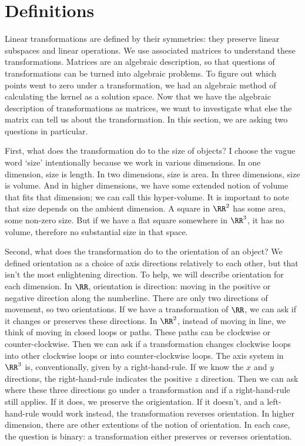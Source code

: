 \documentclass[fleqn]{report}
\begin{document}
\section{Definitions}
\label{determinants-definition}

Linear transformations are defined by their symmetries: they
preserve linear subspaces and linear operations. We use
associated matrices to understand these transformations.
Matrices are an algebraic description, so that questions of
transformations can be turned into algebraic problems. To
figure out which points went to zero under a transformation,
we had an algebraic method of calculating the kernel as a
solution space. Now that we have the algebraic description of
transformations as matrices, we want to investigate what else
the matrix can tell us about the transformation. In this
section, we are asking two questions in particular. 

First, what does the transformation do to the size of objects?
I choose the vague word `size' intentionally because we work
in various dimensions. In one dimension, size is length. In
two dimensions, size is area. In three dimensions, size is
volume. And in higher dimensions, we have some extended
notion of volume that fits that dimension; we can call this
hyper-volume. It is important to note that size depends on
the ambient dimension. A square in $\RR^2$ has some area,
some non-zero size. But if we have a flat square somewhere in
$\RR^3$, it has no volume, therefore no substantial size in
that space. 

Second, what does the transformation do to the orientation of
an object? We defined orientation as a choice of axis
directions relatively to each other, but that isn't the most
enlightening direction. To help, we will describe orientation
for each dimension. In $\RR$, orientation is direction: moving
in the positive or negative direction along the numberline.
There are only two directions of movement, so two
orientations. If we have a transformation of $\RR$, we can ask
if it changes or preserves these directions. In $\RR^2$,
instead of moving in line, we think of moving in closed loops
or paths. These paths can be clockwise or counter-clockwise.
Then we can ask if a transformation changes clockwise loops
into other clockwise loops or into counter-clockwise loops.
The axis system in $\RR^3$ is, conventionally, given by a
right-hand-rule. If we know the $x$ and $y$ directions, the
right-hand-rule indicates the positive $z$ direction. Then we
can ask where these three directions go under a transformation
and if a right-hand-rule still applies. If it does, we
preserve the origientation. If it doesn't, and a
left-hand-rule would work instead, the transformation reverses
orientation. In higher dimension, there are other extentions
of the notion of orientation. In each case, the question is
binary: a transformation either preserves or reverses
orientation.
\end{document}
